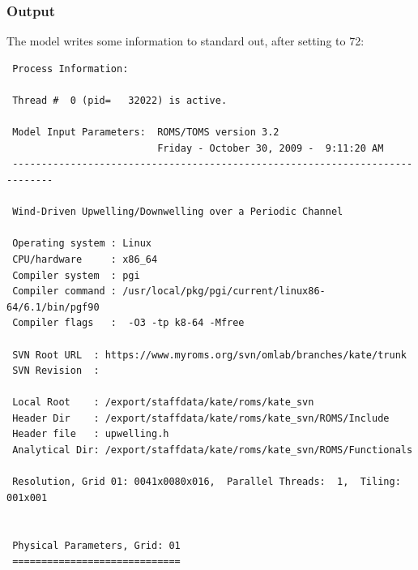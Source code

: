 \subsubsection{Output}
The model writes some information to standard out, after setting
 to 72:
\begin{verbatim}
 Process Information:

 Thread #  0 (pid=   32022) is active.

 Model Input Parameters:  ROMS/TOMS version 3.2  
                          Friday - October 30, 2009 -  9:11:20 AM
 -----------------------------------------------------------------------------

 Wind-Driven Upwelling/Downwelling over a Periodic Channel

 Operating system : Linux
 CPU/hardware     : x86_64
 Compiler system  : pgi
 Compiler command : /usr/local/pkg/pgi/current/linux86-64/6.1/bin/pgf90
 Compiler flags   :  -O3 -tp k8-64 -Mfree

 SVN Root URL  : https://www.myroms.org/svn/omlab/branches/kate/trunk
 SVN Revision  : 

 Local Root    : /export/staffdata/kate/roms/kate_svn
 Header Dir    : /export/staffdata/kate/roms/kate_svn/ROMS/Include
 Header file   : upwelling.h
 Analytical Dir: /export/staffdata/kate/roms/kate_svn/ROMS/Functionals

 Resolution, Grid 01: 0041x0080x016,  Parallel Threads:  1,  Tiling: 001x001


 Physical Parameters, Grid: 01
 =============================


\end{verbatim}
